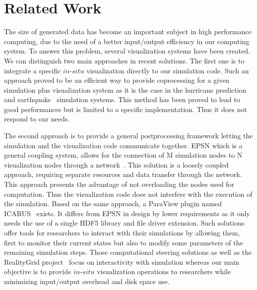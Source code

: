 \section{Related Work}
\label{sec:related}

The size of generated data has become an important subject in high performance 
computing, due to the need of a better input/output efficiency in our computing 
system. To answer this problem, several visualization systems have been created.
We can distinguish two main approaches in recent solutions. The first one is to 
integrate a specific $in$-$situ$ visualization directly to our simulation code. 
Such an approach proved to be an efficient way to provide coprocessing for a given
simulation plus visualization system as it is the case in the hurricane
prediction~\cite{4015457} and earthquake~\cite{4090186} simulation systems.
This method has been proved to lead to good performances but is limited 
to a specific implementation. Thus it does not respond to our needs. 

The second approach is to provide a general postprocessing framework letting the
simulation and the visualization code communicate together. EPSN which is a
general coupling system, allows for the connection of M simulation nodes to N
visualization nodes through a network~\cite{4020782}. This solution is a
loosely coupled approach, requiring separate resources and data transfer
through the network. This approach presents the advantage of not overloading
the nodes used for computation. Thus the visualization code does not interfere
with the execution of the simulation. Based on the same approach, a ParaView
plugin named ICARUS~\cite{6152102}
exists. It differs from EPSN in design by lower requirements as it only needs
the use of a single HDF5 library and file driver extension. Such solutions
offer tools for researchers to interact with their simulations by allowing
them, first to monitor their current states but also to modify
some parameters of the remaining simulation steps. Those computational steering
solutions as well as the RealityGrid
project~\cite{Harting03computationalsteering} focus on interactivity with
simulation whereas our main objective is to provide $in$-$situ$ visualization
operations to researchers while minimizing input/output overhead and disk
space use. 

